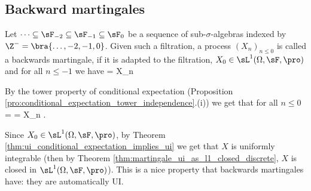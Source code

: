 




\subsection{Backward martingales}

\begin{definition}\label{def:backward_martingale_discrete}
Let $\dots \subseteq \sF_{-2} \subseteq \sF_{-1} \subseteq \sF_0$ be a sequence of sub-$\sigma$-algebras indexed by $\Z^- = \bra{\dots,-2,-1,0}$. Given such
a filtration, a process $(X_n)_{n \leq 0}$ is called a backwards martingale, if it is adapted to the filtration, $X_0 \in \sL^1(\Omega,\sF,\pro)$ and for all $n \leq -1$ we have
\be
\E{} = X_n
\ee
\end{definition}

\begin{remark}
By the tower property of conditional expectation (Proposition \ref{pro:conditional_expectation_tower_independence}.(i)) we get that for all $n \leq 0$
\be
\E{} = \E {} = X_n .
\ee

Since $X_0 \in \sL^1(\Omega,\sF,\pro)$, by Theorem \ref{thm:ui_conditional_expectation_implies_ui} we get that $X$ is uniformly integrable (then by Theorem \ref{thm:martingale_ui_as_l1_closed_discrete}, $X$ is closed in $\sL^1(\Omega,\sF,\pro)$). This is a nice property that backwards martingales have: they are automatically UI.
\end{remark}


